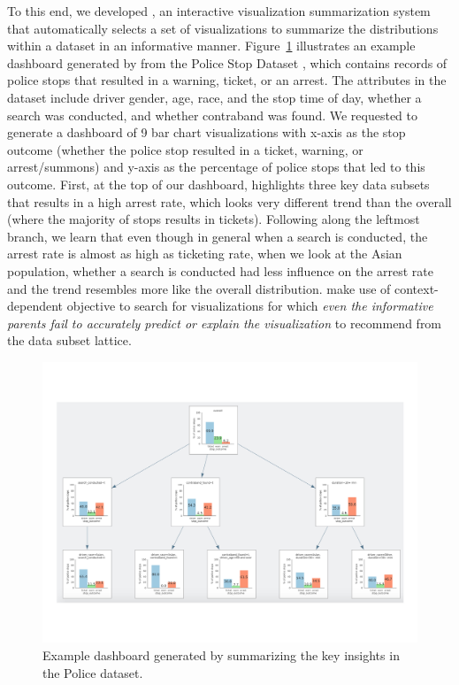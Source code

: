 \par To this end, we developed \sbd, an interactive visualization summarization system that automatically selects a set of visualizations to summarize the distributions within a dataset in an informative manner. Figure~\ref{fig:sbd} illustrates an example dashboard generated by \sbd from the Police Stop Dataset \cite{police}, which contains records of police stops that resulted in a warning, ticket, or an arrest. The attributes in the dataset include driver gender, age, race, and the stop time of day, whether a search was conducted, and whether contraband was found. We requested \sbd to generate a dashboard of 9 bar chart visualizations with x-axis as the stop outcome (whether the police stop resulted in a ticket, warning, or arrest/summons) and y-axis as the percentage of police stops that led to this outcome. First, at the top of our dashboard, \sbd highlights three key data subsets that results in a high arrest rate, which looks very different trend than the overall (where the majority of stops results in tickets). Following along the leftmost branch, we learn that even though in general when a search is conducted, the arrest rate is almost as high as ticketing rate, when we look at the Asian population, whether a search is conducted had less influence on the arrest rate and the trend resembles more like the overall distribution. \sbd make use of context-dependent objective to search for visualizations for which \emph{even the informative parents fail to accurately predict or explain the visualization} to recommend from the data subset lattice. 
\begin{figure}[h!]
\centering
\includegraphics[width=0.7\linewidth]{figures/storyboard.pdf}
\caption{Example dashboard generated by \sbd summarizing the key insights in the Police dataset.}
\label{fig:sbd}
\end{figure} 
